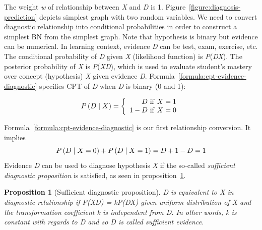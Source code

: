 \documentclass{article}
\numberwithin{equation}{section}
\numberwithin{figure}{section}
\numberwithin{table}{section}
\newtheorem{proposition}{Proposition}[section]
\begin{document}
The weight \textit{w} of relationship between \textit{X} and \textit{D} is 1. Figure~\ref{figure:diagnosis-prediction} depicts simplest graph with two random variables. We need to convert diagnostic relationship into conditional probabilities in order to construct a simplest BN from the simplest graph. Note that hypothesis is binary but evidence can be numerical. In learning context, evidence \textit{D} can be test, exam, exercise, etc. The conditional probability of \textit{D} given \textit{X} (likelihood function) is \textit{P}(\textit{D}{\textbar}\textit{X}). The posterior probability of \textit{X} is \textit{P}(\textit{X}{\textbar}\textit{D}), which is used to evaluate student's mastery over concept (hypothesis) \textit{X} given evidence \textit{D}. Formula~\ref{formula:cpt-evidence-diagnostic} specifies CPT of \textit{D} when \textit{D} is binary (0 and 1):

\begin{equation}
P\left(D\mathrel{\left|\vphantom{D X}\right.\kern-\nulldelimiterspace}X\right)=\left\{ \begin{array}{r}
D\ \mathrm{if}\ X=1 \\ 
1-D\ \mathrm{if}\ X=0 \end{array}
\right.
\label{formula:cpt-evidence-diagnostic}
\end{equation}

Formula~\ref{formula:cpt-evidence-diagnostic} is our first relationship conversion. It implies
\[P\left(D\mathrel{\left|\vphantom{D X=0}\right.\kern-\nulldelimiterspace}X=0\right)+P\left(D\mathrel{\left|\vphantom{D X=1}\right.\kern-\nulldelimiterspace}X=1\right)=D+1-D=1\] 
Evidence \textit{D} can be used to diagnose hypothesis \textit{X} if the so-called \textit{sufficient} \textit{diagnostic proposition} is satisfied, as seen in proposition~\ref{proposition:diagnostic-proposition}.

\begin{proposition}[Sufficient diagnostic proposition]
\textit{D} is equivalent to \textit{X} in diagnostic relationship if \textit{P}(\textit{X}{\textbar}\textit{D}) = \textit{kP}(\textit{D}{\textbar}\textit{X}) given uniform distribution of \textit{X} and the \textit{transformation coefficient k} is independent from \textit{D}. In other words, \textit{k} is constant with regards to \textit{D }and\textit{ }so \textit{D} is called \textit{sufficient evidence}.
\label{proposition:diagnostic-proposition}
\end{proposition}
\end{document}

